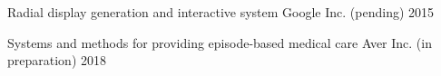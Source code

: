 

\begin{cvhonors}

  \cvhonor
    {Radial display generation and interactive system}
    {Google Inc. (pending)}
    {} %
    {2015} %

  \cvhonor
    {Systems and methods for providing episode-based medical care}
    {Aver Inc. (in preparation)}
    {} %
    {2018} %

\end{cvhonors}
